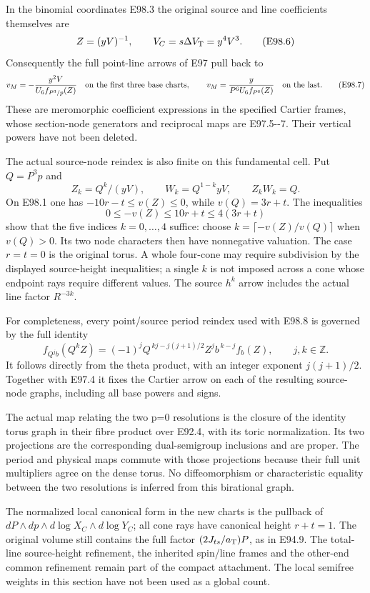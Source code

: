 In the binomial coordinates E98.3 the original
source and line coefficients themselves are
\[
 Z=(yV)^{-1},\qquad V_C=s\Delta V_{\rm T}=y^4V^3.
 \tag{E98.6}
\]
Consequently the full point-line arrows of E97
pull back to
\[
 v_M=-\frac{y^2V}{U_6f_{P^3/p}(Z)}
 \quad\hbox{on the first three base charts},
 \qquad
 v_M=\frac{y}{P^6U_6f_{P^6}(Z)}
 \quad\hbox{on the last}.
 \tag{E98.7}
\]
These are meromorphic coefficient expressions in
the specified Cartier frames, whose section-node
generators and reciprocal maps are E97.5-\/-7.
Their vertical powers have not been deleted.

The actual source-node reindex is also finite on
this fundamental cell. Put \(Q=P^3p\) and
\[
 Z_k=Q^k/(yV),\qquad W_k=Q^{1-k}yV,\qquad
 Z_kW_k=Q.                                     \tag{E98.8}
\]
On E98.1 one has
\(-10r-t\le v(Z)\le0\), while \(v(Q)=3r+t\).
The inequalities
\[
 0\le-v(Z)\le10r+t\le4(3r+t)
\]
show that the five indices \(k=0,\ldots,4\)
suffice: choose \(k=\lceil-v(Z)/v(Q)\rceil\)
when \(v(Q)>0\). Its two node characters then
have nonnegative valuation. The case \(r=t=0\)
is the original torus. A whole four-cone may
require subdivision by the displayed source-height
inequalities; a single \(k\) is not imposed across
a cone whose endpoint rays require different values.
The source \(h^k\) arrow includes the actual line
factor \(R^{-3k}\).

For completeness, every point/source period reindex
used with E98.8 is governed by the full identity
\[
 f_{Q^j b}(Q^kZ)
 =(-1)^jQ^{\,kj-j(j+1)/2}Z^j b^{\,k-j}f_b(Z),
 \qquad j,k\in\mathbb Z.                        \tag{E98.9}
\]
It follows directly from the theta product, with
an integer exponent \(j(j+1)/2\). Together with
E97.4 it fixes the Cartier arrow on each of the
resulting source-node graphs, including all base
powers and signs.

The actual map relating the two p=0 resolutions is
the closure of the identity torus graph in their
fibre product over E92.4, with its toric normalization.
Its two projections are the corresponding
dual-semigroup inclusions and are proper. The
period and physical maps commute with those
projections because their full unit multipliers
agree on the dense torus. No diffeomorphism or
characteristic equality between the two resolutions
is inferred from this birational graph.

The normalized local canonical form in the new
charts is the pullback of
\(dP\wedge dp\wedge d\log X_C\wedge d\log Y_C\);
all cone rays have canonical height \(r+t=1\).
The original volume still contains the full
factor \((2J_{ts}/a_{\rm T})P\), as in E94.9.
The total-line source-height refinement, the
inherited spin/line frames and the other-end
common refinement remain part of the compact
attachment. The local semifree weights in this
section have not been used as a global count.


